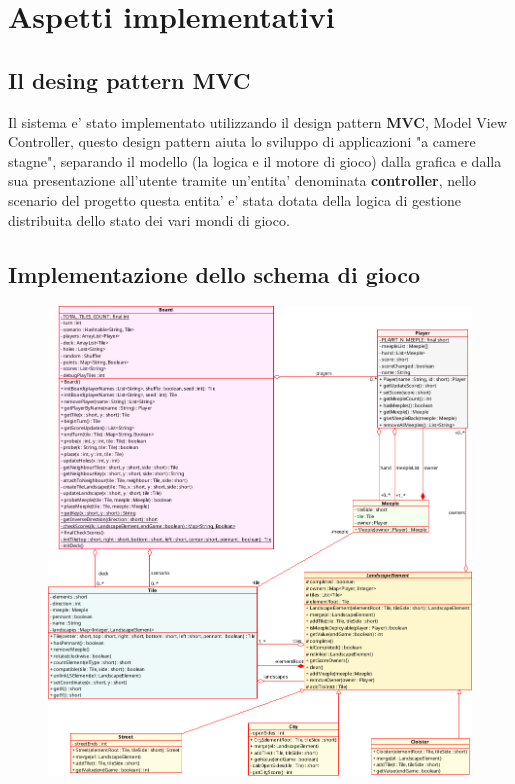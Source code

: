 \section{Aspetti implementativi}



\subsection{Il desing pattern MVC}
Il sistema e' stato implementato utilizzando il design pattern \textbf{MVC},
Model View Controller, questo design pattern aiuta lo sviluppo di applicazioni
"a camere stagne", separando il modello (la logica e il motore di gioco) dalla
grafica e dalla sua presentazione all'utente tramite un'entita' denominata
\textbf{controller}, nello scenario del progetto questa entita' e' stata
dotata della logica di gestione distribuita dello stato dei vari mondi di gioco.

\subsection{Implementazione dello schema di gioco}

\begin{figure}
\includegraphics[width=\textwidth]{img/modelClassDiagram.png}
\end{figure}

